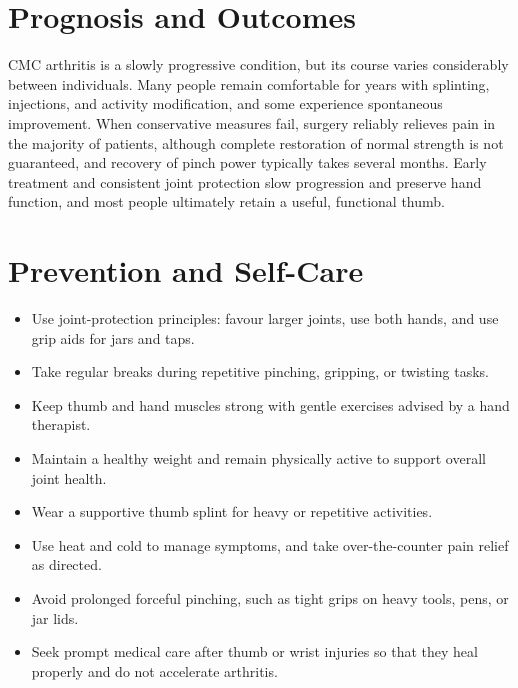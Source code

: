 \section*{Prognosis and Outcomes}
CMC arthritis is a slowly progressive condition, but its course varies considerably between individuals. Many people remain comfortable for years with splinting, injections, and activity modification, and some experience spontaneous improvement. When conservative measures fail, surgery reliably relieves pain in the majority of patients, although complete restoration of normal strength is not guaranteed, and recovery of pinch power typically takes several months. Early treatment and consistent joint protection slow progression and preserve hand function, and most people ultimately retain a useful, functional thumb.

\section*{Prevention and Self-Care}
\begin{itemize}
    \item Use joint-protection principles: favour larger joints, use both hands, and use grip aids for jars and taps.
    \item Take regular breaks during repetitive pinching, gripping, or twisting tasks.
    \item Keep thumb and hand muscles strong with gentle exercises advised by a hand therapist.
    \item Maintain a healthy weight and remain physically active to support overall joint health.
    \item Wear a supportive thumb splint for heavy or repetitive activities.
    \item Use heat and cold to manage symptoms, and take over-the-counter pain relief as directed.
    \item Avoid prolonged forceful pinching, such as tight grips on heavy tools, pens, or jar lids.
    \item Seek prompt medical care after thumb or wrist injuries so that they heal properly and do not accelerate arthritis.
\end{itemize}

